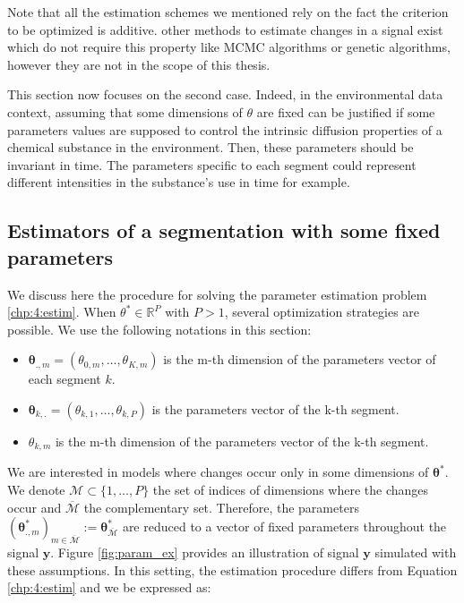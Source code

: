Note that all the estimation schemes we mentioned rely on the fact the criterion to be optimized is additive. other methods to estimate changes in a signal exist which do not require this property like MCMC algorithms \citep{Lavielle2001} or genetic algorithms, however they are not in the scope of this thesis.  

This section now focuses on the second case. Indeed, in the environmental data context, assuming that some dimensions of $\theta$ are fixed can be justified if some parameters values are supposed to control the intrinsic diffusion properties of a chemical substance in the environment. Then, these parameters should be invariant in time. The parameters specific to each segment could represent different intensities in the substance's use in time for example. 

\subsection{Estimators of a segmentation with some fixed parameters}

We discuss here the procedure for solving the parameter estimation problem \eqref{chp:4:estim}. When $\theta^* \in \mathbb{R}^P$ with $P > 1$, several optimization strategies are possible. We use the following notations in this section: 
\begin{itemize}
\item $\bm \theta_{.,m} = (\theta_{0,m},\dots,\theta_{K,m})$ is the m-th dimension of the parameters vector of each segment $k$.
\item $\bm \theta_{k,.} = (\theta_{k,1},\dots,\theta_{k,P})$ is the parameters vector of the k-th segment.
\item $\theta_{k,m}$ is the m-th dimension of the parameters vector of the k-th segment.
\end{itemize}

We are interested in models where changes occur only in some dimensions of $\bm\theta^*$. We denote $\mathcal{M} \subset \{1,\dots,P\}$ the set of indices of dimensions where the changes occur and $\overline{\mathcal{M}}$ the complementary set. Therefore, the parameters $(\bm\theta^*_{.,m})_{m \in \overline{\mathcal{M}}} := \bm\theta^*_{\overline{\mathcal{M}}}$ are reduced to a vector of fixed parameters throughout the signal $\bm y$. Figure \ref{fig:param_ex} provides an illustration of signal $\bm y$ simulated with these assumptions. In this setting, the estimation procedure differs from Equation \eqref{chp:4:estim} and we be expressed as: 
    
